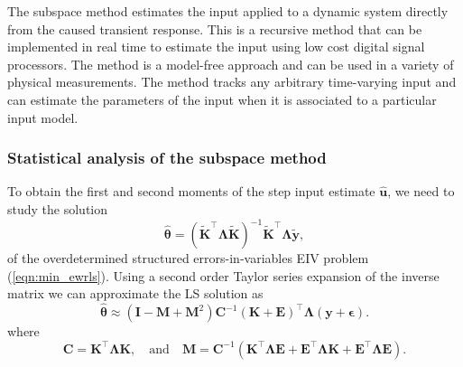 The subspace method estimates the input applied to a dynamic system directly from the caused transient response.
This is a recursive method that can be implemented in real time to estimate the input  using low cost digital signal processors.
The method is a model-free approach and can be used in a variety of physical measurements.
The method  tracks any arbitrary time-varying input and can estimate the parameters of the input when it is associated to a particular input model.


\subsubsection{Statistical analysis of the subspace method}

To obtain the first and second moments of the step input estimate $\widehat{\mathbf{u}}$, we need to study the solution
\begin{equation} \widehat{\bm{\theta}} = ( \widetilde{\mathbf{K}}^\top \bm{\Lambda} \widetilde{\mathbf{K}}  )^{-1} \widetilde{\mathbf{K}}^\top \bm{\Lambda} \widetilde{\mathbf{y}} , \label{eqn:xhatW} \end{equation}
of the overdetermined structured errors-in-variables EIV problem (\ref{eqn:min_ewrls}).
Using a second order Taylor series expansion of the inverse matrix we can approximate the LS solution as
\begin{equation} \widehat{\bm{\theta}} \approx \left( \mathbf{I} - \mathbf{M} + \mathbf{M}^2 \right) \mathbf{C}^{-1} (\mathbf{K} + \mathbf{E})^\top \bm{\Lambda} (\mathbf{y} + \bm{\epsilon}). \label{eqn:xhatexpW} \end{equation} 
where 
\begin{equation} \mathbf{C} = \mathbf{K}^\top \bm{\Lambda} \mathbf{K}, \quad \text{and} \quad \mathbf{M} = \mathbf{C}^{-1} ( \mathbf{K}^\top \bm{\Lambda} \mathbf{E} + \mathbf{E}^\top \bm{\Lambda} \mathbf{K} + \mathbf{E}^\top \bm{\Lambda} \mathbf{E} ). \end{equation} 

